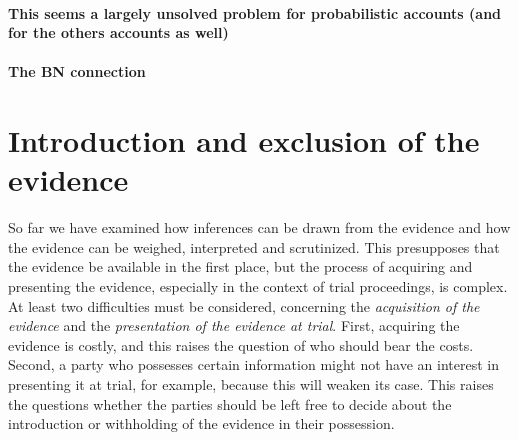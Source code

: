 \documentclass[10pt]{article}
\begin{document}
\paragraph{This seems a largely unsolved problem for probabilistic accounts (and for the others accounts as well)}

\paragraph{The BN connection}


\section{Introduction and exclusion of the evidence}

So far we have examined how inferences can be drawn from the evidence and how the evidence 
can be weighed, interpreted and scrutinized. This presupposes that the evidence be available in the first place, 
but the process of acquiring and presenting the evidence, especially in the 
context of trial proceedings, is complex. At least two difficulties must be considered, concerning the \textit{acquisition of the evidence} 
and the \textit{presentation of the evidence at trial}. First, acquiring the evidence is costly, and this raises the question of who should bear the costs.
Second, a party who possesses certain information might not have an interest in presenting it at trial, for example, because this 
will weaken its case. This raises the questions whether the parties should be left free to decide about the 
introduction or withholding of the evidence in their possession.
\end{document}

